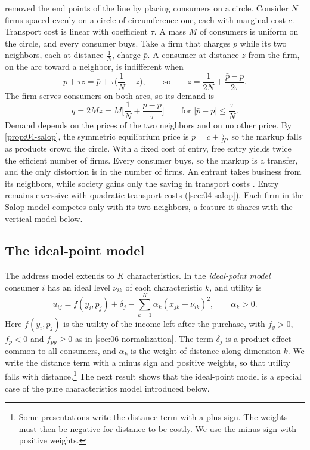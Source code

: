 \citet{Salop1979} removed the end points of the line by placing consumers on a circle. Consider $N$ firms
spaced evenly on a circle of circumference one, each with marginal cost $c$. Transport cost is linear with
coefficient $\tau$. A mass $M$ of consumers is uniform on the circle, and every consumer buys. Take a firm that
charges $p$ while its two neighbors, each at distance $\frac{1}{N}$, charge $\bar p$. A consumer at distance $z$
from the firm, on the arc toward a neighbor, is indifferent when
\begin{equation*}
  p + \tau z = \bar p + \tau\Big(\frac{1}{N} - z\Big),
  \qquad\text{so}\qquad
  z = \frac{1}{2N} + \frac{\bar p - p}{2\tau}.
\end{equation*}
The firm serves consumers on both arcs, so its demand is
\begin{equation*}
  q = 2Mz = M\Big[\frac{1}{N} + \frac{\bar p - p}{\tau}\Big] \qquad\text{for } |\bar p - p| \le \frac{\tau}{N}.
\end{equation*}
Demand depends on the prices of the two neighbors and on no other price. By \cref{prop:04-salop}, the symmetric
equilibrium price is $p = c + \frac{\tau}{N}$, so the markup falls as products crowd the circle. With a fixed cost
of entry, free entry yields twice the efficient number of firms. Every consumer buys, so the markup is a
transfer, and the only distortion is in the number of firms. An entrant takes business from its neighbors,
while society gains only the saving in transport costs \citep[sec.~7.1.2]{Tirole1988}. Entry remains excessive
with quadratic transport costs (\cref{sec:04-salop}). Each firm in the Salop model competes only with its two
neighbors, a feature it shares with the vertical model below.

\subsection{The ideal-point model}\label{sec:06-idealpoint}

The address model extends to $K$ characteristics. In the \emph{ideal-point model}
\citep{AndersonDePalmaThisse1992} consumer $i$ has an ideal level $\nu_{ik}$ of each characteristic $k$,
and utility is
\begin{equation}\label{eq:06-idealpoint}
  u_{ij} = f(y_i, p_j) + \delta_j - \sum_{k=1}^K \alpha_k (x_{jk} - \nu_{ik})^2, \qquad \alpha_k > 0.
\end{equation}
Here $f(y_i, p_j)$ is the utility of the income left after the purchase, with $f_y > 0$, $f_p < 0$ and
$f_{py} \ge 0$ as in \cref{sec:06-normalization}. The term $\delta_j$ is a product effect common to all
consumers, and $\alpha_k$ is the weight of distance along dimension $k$. We write the distance term with
a minus sign and positive weights, so that utility falls with distance.\footnote{Some presentations
write the distance term with a plus sign. The weights must then be negative for distance to be costly.
We use the minus sign with positive weights.} The next result shows that
the ideal-point model is a special case of the pure characteristics model introduced below.

